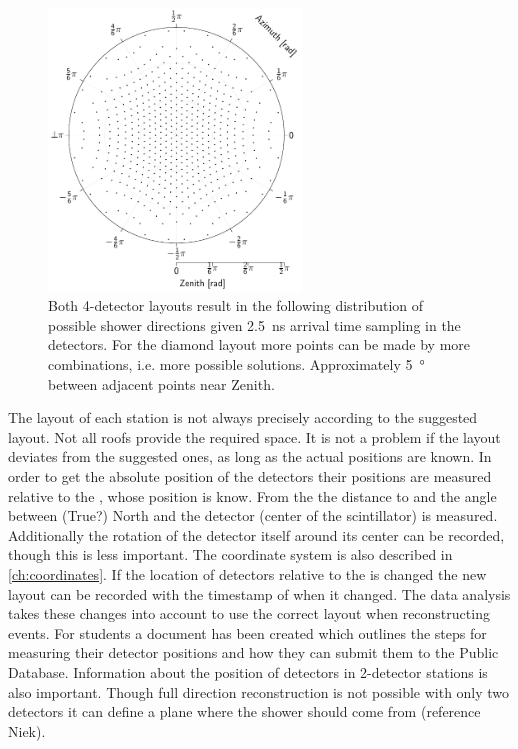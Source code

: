 \begin{figure}
    \centering
    \includegraphics[width=0.6\textwidth]
                    {plots/experiment/discrete_directions}
    \caption{Both 4-detector layouts result in the following distribution of possible shower directions given \SI{2.5}{\ns} arrival time sampling in the detectors. For the diamond layout more points can be made by more combinations, i.e. more possible solutions. Approximately \SI{5}{\degree} between adjacent points near Zenith.}
    \label{fig:discrete_directions}
\end{figure}

The layout of each station is not always precisely according to the suggested layout. Not all roofs provide the required space. It is not a problem if the layout deviates from the suggested ones, as long as the actual positions are known. In order to get the absolute position of the detectors their positions are measured relative to the \gps, whose position is know. From the \gps the distance to and the angle between (True?) North and the detector (center of the scintillator) is measured. Additionally the rotation of the detector itself around its center can be recorded, though this is less important. The coordinate system is also described in \cref{ch:coordinates}. If the location of detectors relative to the \gps is changed the new layout can be recorded with the timestamp of when it changed. The data analysis takes these changes into account to use the correct layout when reconstructing events. For students a document has been created which outlines the steps for measuring their detector positions and how they can submit them to the Public Database. Information about the position of detectors in 2-detector stations is also important. Though full direction reconstruction is not possible with only two detectors it can define a plane where the shower should come from (reference Niek).

